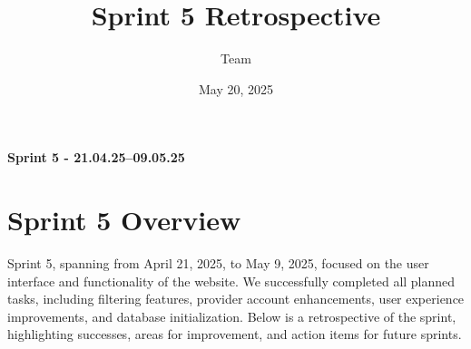 \documentclass[a4paper,12pt]{article}
\title{Sprint 5 Retrospective}
\author{Team}
\date{May 20, 2025}
\begin{document}
\maketitle
\textbf{Sprint 5 - 21.04.25–09.05.25} 

\section*{Sprint 5 Overview}
Sprint 5, spanning from April 21, 2025, to May 9, 2025, focused on the user interface and functionality of the website. We successfully completed all planned tasks, including filtering features, provider account enhancements, user experience improvements, and database initialization. Below is a retrospective of the sprint, highlighting successes, areas for improvement, and action items for future sprints.
\end{document}
